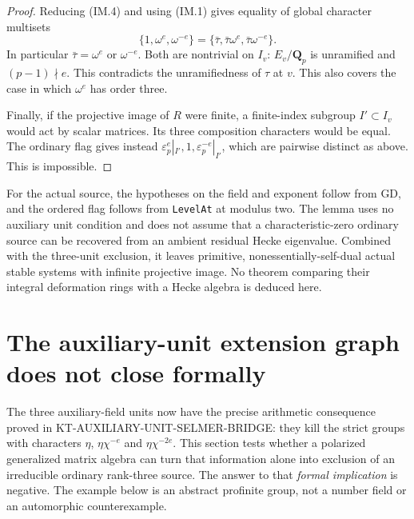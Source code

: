 \documentclass[11pt,a4paper]{article}
\theoremstyle{definition}
\begin{document}
\begin{proof}
Reducing (IM.4) and using (IM.1) gives equality of global
character multisets
\[
 \{1,\omega^e,\omega^{-e}\}
       =\{\bar\tau,\bar\tau\omega^e,
                                  \bar\tau\omega^{-e}\}. \tag{IM.5}
\]
In particular $\bar\tau=\omega^e$ or $\omega^{-e}$.
Both are nontrivial on $I_v$: $E_v/\mathbf Q_p$ is unramified
and $(p-1)\nmid e$.  This contradicts the unramifiedness of
$\tau$ at $v$.  This also covers the case in which
$\omega^e$ has order three.

Finally, if the projective image of $R$ were finite, a
finite-index subgroup $I'\subset I_v$ would act by scalar
matrices.  Its three composition characters would be equal.
The ordinary flag gives instead
$\varepsilon_p^e|_{I'},1,\varepsilon_p^{-e}|_{I'}$, which
are pairwise distinct as above.  This is impossible.
\end{proof}

For the actual source, the hypotheses on the field and exponent
follow from GD, and the ordered flag follows from
\texttt{LevelAt} at modulus two.  The lemma uses no auxiliary
unit condition and does not assume that a characteristic-zero
ordinary source can be recovered from an ambient residual
Hecke eigenvalue.  Combined with the three-unit exclusion,
it leaves primitive, nonessentially-self-dual actual stable
systems with infinite projective image.  No theorem comparing
their integral deformation rings with a Hecke algebra is
deduced here.



\section{The auxiliary-unit extension graph does not close formally}
\label{sec:kt-polarized-extension-graph}

The three auxiliary-field units now have the precise
arithmetic consequence proved in
KT-AUXILIARY-UNIT-SELMER-BRIDGE: they kill the strict
groups with characters $\eta$, $\eta\chi^{-e}$ and
$\eta\chi^{-2e}$.  This section tests whether a
polarized generalized matrix algebra can turn that
information alone into exclusion of an irreducible
ordinary rank-three source.  The answer to that
\emph{formal implication} is negative.  The example
below is an abstract profinite group, not a number
field or an automorphic counterexample.
\end{document}
